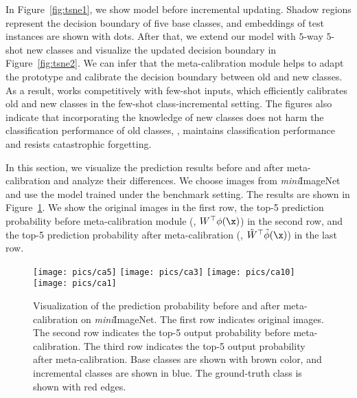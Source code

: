 In Figure~\ref{fig:tsne1}, we show model before incremental updating. 
Shadow regions represent the decision boundary of five base classes, and embeddings of test instances are shown with dots.
After that, we extend our model with $5$-way $5$-shot new classes and visualize the updated decision boundary in Figure~\ref{fig:tsne2}. We can infer that the meta-calibration module helps to adapt the prototype and calibrate the decision boundary between old and new classes. 
As a result,  \name works competitively with few-shot inputs, which efficiently calibrates old and new classes in the few-shot class-incremental setting. The figures also indicate that incorporating  the knowledge of new classes does not harm the classification performance of old classes, \ie, \name maintains classification performance and resists catastrophic forgetting.







In this section, we visualize the prediction results before and after meta-calibration and analyze their differences. We choose images from \textit{mini}ImageNet and use the model trained under the benchmark setting. The results are shown in Figure~\ref{figure:meta-calibration}. We show the original images in the first row, the top-5 prediction probability before meta-calibration module (\ie, $W^\top \phi(\x)$) in the second row, and the top-5 prediction probability after meta-calibration (\ie, ${\tilde{W}}^\top \tilde{\phi}(\x)$) in the last row.



\begin{figure}[t]
	\begin{center}
		
		
		{	
			\texttt{[image: pics/ca5]}
			\texttt{[image: pics/ca3]}
			\texttt{[image: pics/ca10]}
			\texttt{[image: pics/ca1]}
			
			
			
			
		}
		
	\end{center}
\caption{ Visualization of the prediction probability before and after meta-calibration on \textit{mini}ImageNet. The first row indicates original images. The second row indicates the top-5 output probability before meta-calibration. The third row indicates the top-5 output probability after meta-calibration.
		Base classes are shown with brown color, and incremental classes are shown in blue. The ground-truth class is shown with red edges.
	} \label{figure:meta-calibration}
\end{figure}


